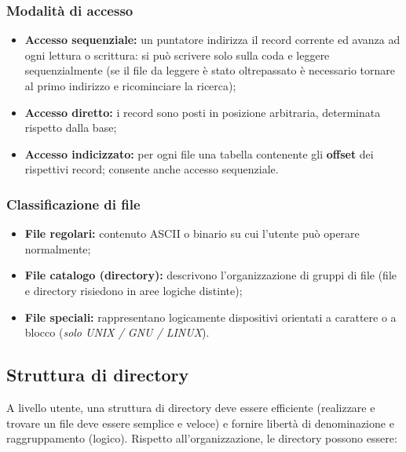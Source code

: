 \documentclass{article}
\begin{document}
\subsubsection{Modalità di accesso} \begin{itemize}
    \item \textbf{Accesso sequenziale:} un puntatore indirizza il record corrente ed avanza ad ogni lettura o scrittura: si può scrivere solo sulla coda e leggere sequenzialmente (se il file da leggere è stato oltrepassato è necessario tornare al primo indirizzo e ricominciare la ricerca);
    \item \textbf{Accesso diretto:} i record sono posti in posizione arbitraria, determinata rispetto dalla base;
    \item \textbf{Accesso indicizzato:} per ogni file una tabella contenente gli \textbf{offset} dei rispettivi record; consente anche accesso sequenziale.
\end{itemize}

\subsubsection{Classificazione di file}
\begin{itemize}
    \item \textbf{File regolari:} contenuto ASCII o binario su cui l'utente può operare normalmente;
    \item \textbf{File catalogo (directory):} descrivono l'organizzazione di gruppi di file (file e directory risiedono in aree logiche distinte);
    \item \textbf{File speciali:} rappresentano logicamente dispositivi orientati a carattere o a blocco (\textit{solo UNIX / GNU / LINUX}).
\end{itemize}

\subsection{Struttura di directory} A livello utente, una struttura di directory deve essere efficiente (realizzare e trovare un file deve essere semplice e veloce) e fornire libertà di denominazione e raggruppamento (logico). Rispetto all'organizzazione, le directory possono essere:
\end{document}
